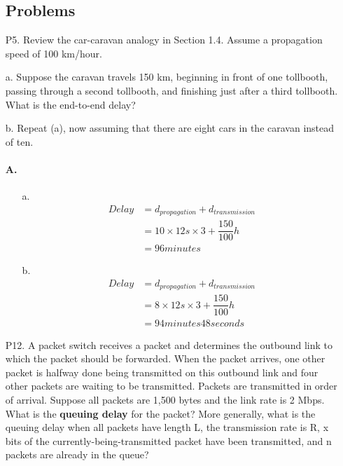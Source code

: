 \documentclass[]{article}
\begin{document}
\begin{enumerate}
	\subsection{Problems}
	\item[P5.]
	Review the car-caravan analogy in Section 1.4. Assume a propagation speed
	of 100 km/hour.
	
	a. Suppose the caravan travels 150 km, beginning in front of one tollbooth,
	passing through a second tollbooth, and finishing just after a third tollbooth. What is the end-to-end delay?
	
	b. Repeat (a), now assuming that there are eight cars in the caravan instead
	of ten.
	
	\paragraph{A.}
	\begin{enumerate}
		\item[a.] 
		\begin{equation}
			\begin{split}
				Delay & = d_{propagation} + d_{transmission} \\ & = 10 \times 12 s \times 3 + \dfrac{150}{100} h \\ & = 96 minutes
			\end{split}
		\end{equation}
		
		\item[b.] 
		\begin{equation}
			\begin{split}
				Delay & = d_{propagation} + d_{transmission} \\ & = 8 \times 12 s \times 3 + \dfrac{150}{100} h \\ & = 94 minutes 48 seconds
			\end{split}
		\end{equation}
	\end{enumerate}
	
	\item[P12.]
	A packet switch receives a packet and determines the outbound link to which
	the packet should be forwarded. When the packet arrives, one other packet is
	halfway done being transmitted on this outbound link and four other packets
	are waiting to be transmitted. Packets are transmitted in order of arrival.
	Suppose all packets are 1,500 bytes and the link rate is 2 Mbps. What is the
	\textbf{queuing delay} for the packet? More generally, what is the queuing delay
	when all packets have length L, the transmission rate is R, x bits of the
	currently-being-transmitted packet have been transmitted, and n packets are
	already in the queue?
	

\end{enumerate}
\end{document}
